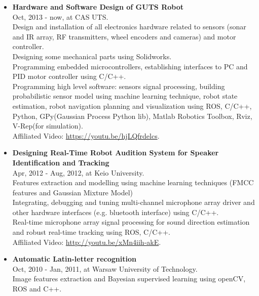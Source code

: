 \documentclass[margin,line]{res}
\begin{document}
\begin{resume}
\begin{itemize}
\item {\bf Hardware and Software Design of GUTS Robot}\\
Oct, 2013 - now, at CAS UTS.\\
Design and installation of all electronics hardware related to sensors (sonar and IR array, RF transmitters, wheel encoders and cameras) and motor controller. \\
Designing some mechanical parts using Solidworks.\\
Programming embedded microcontrollers, establishing interfaces to PC and PID motor controller using C/C++.\\
Programming high level software: sensors signal processing, building probabilistic sensor model using machine learning technique, robot state estimation, robot navigation planning and visualization using ROS, C/C++, Python, GPy(Gaussian Process Python lib), Matlab Robotics Toolbox, Rviz, V-Rep(for simulation).\\
Affiliated Video: \href{https://youtu.be/hjLQfrdelcs}{https://youtu.be/hjLQfrdelcs}.\\

\item {\bf  Designing Real-Time Robot Audition System for Speaker Identification and Tracking}\\
Apr, 2012 - Aug, 2012, at Keio University.\\
Features extraction and modelling using machine learning techniques (FMCC features and Gaussian Mixture Model)\\
Integrating, debugging and tuning multi-channel microphone array driver and other hardware interfaces (e.g. bluetooth interface) using C/C++.\\ 
Real-time microphone array signal processing for sound direction estimation and robust real-time tracking using ROS, C/C++.\\
Affiliated Video: \href{http://youtu.be/xMn4iih-akE}{http://youtu.be/xMn4iih-akE}.\\

%
\item {\bf Automatic Latin-letter recognition}\\
Oct, 2010 - Jan, 2011, at Warsaw University of Technology.\\
Image features extraction and Bayesian supervised learning using openCV, ROS and C++.\\


\end{itemize}
\end{resume}
\end{document}

